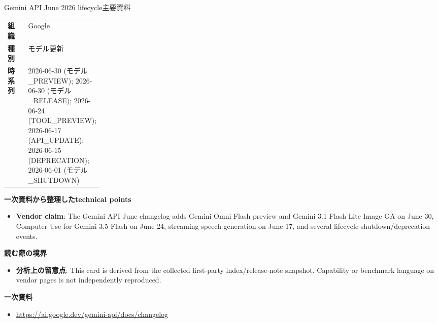 \begin{technicalnote}{Gemini API June 2026 lifecycle}{主要資料}
\begin{tabularx}{\linewidth}{@{}>{\bfseries}p{0.22\linewidth}X@{}}
組織 & Google \\
種別 & モデル更新 \\
時系列 & 2026-06-30 (モデル\_PREVIEW); 2026-06-30 (モデル\_RELEASE); 2026-06-24 (TOOL\_PREVIEW); 2026-06-17 (API\_UPDATE); 2026-06-15 (DEPRECATION); 2026-06-01 (モデル\_SHUTDOWN) \\
\end{tabularx}
\smallskip
{\bfseries 一次資料から整理したtechnical points}
\begin{itemize}[leftmargin=1.5em,itemsep=0.35em]
\item \textbf{Vendor claim}: The Gemini API June changelog adds Gemini Omni Flash preview and Gemini 3.1 Flash Lite Image GA on June 30, Computer Use for Gemini 3.5 Flash on June 24, streaming speech generation on June 17, and several lifecycle shutdown/deprecation events.
\end{itemize}
{\bfseries 読む際の境界}
\begin{itemize}[leftmargin=1.5em,itemsep=0.35em]
\item \textbf{分析上の留意点}: This card is derived from the collected first-party index/release-note snapshot. Capability or benchmark language on vendor pages is not independently reproduced.
\end{itemize}
{\bfseries 一次資料}
\begingroup\sloppy
\begin{itemize}[leftmargin=1.5em,itemsep=0.25em]
\item {\scriptsize\url{https://ai.google.dev/gemini-api/docs/changelog}}
\end{itemize}
\endgroup
\end{technicalnote}
\medskip


